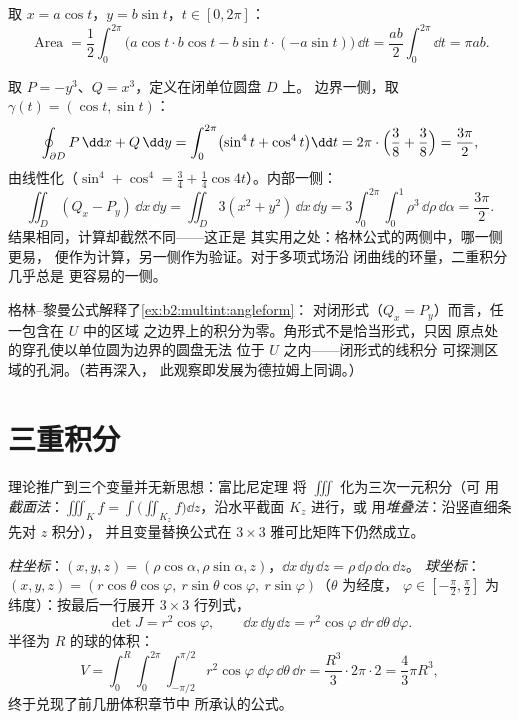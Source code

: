 \begin{example}[椭圆的面积]\label{ex:b2:multint:ellipsearea}
取 $x = a\cos t$，$y = b\sin t$，$t \in [0, 2\pi]$：
\[
\operatorname{Area}
= \frac12\int_0^{2\pi}\bigl(a\cos t \cdot b\cos t
- b\sin t\cdot(-a\sin t)\bigr)\,\dd t
= \frac{ab}{2}\int_0^{2\pi}\dd t = \pi ab .
\]
\end{example}

\begin{example}\label{ex:b2:multint:greencheck}
取 $P = -y^3$、$Q = x^3$，定义在闭单位圆盘 $D$ 上。
边界一侧，取 $\gamma(t) = (\cos t, \sin t)$：
\[
\oint_{\partial D}P\,\dd x + Q\,\dd y
= \int_0^{2\pi}\bigl(\sin^4 t + \cos^4 t\bigr)\dd t
= 2\pi\cdot\Bigl(\frac38 + \frac38\Bigr) = \frac{3\pi}2 ,
\]
由线性化（$\sin^4 + \cos^4 = \tfrac34 +
\tfrac14\cos4t$）。内部一侧：
\[
\iint_D(Q_x - P_y)\,\dd x\,\dd y
= \iint_D 3(x^2 + y^2)\,\dd x\,\dd y
= 3\int_0^{2\pi}\!\!\int_0^1\rho^3\,\dd\rho\,\dd\alpha
= \frac{3\pi}2 .
\]
结果相同，计算却截然不同——这正是
其实用之处：格林公式的两侧中，哪一侧更易，
便作为计算，另一侧作为验证。对于多项式场沿
闭曲线的环量，二重积分几乎总是
更容易的一侧。
\end{example}

\begin{remark}
格林–黎曼公式解释了\cref{ex:b2:multint:angleform}：
对闭形式（$Q_x = P_y$）而言，任一包含在 $U$ 中的区域
之边界上的积分为零。角形式不是恰当形式，只因
原点处的穿孔使以单位圆为边界的圆盘无法
位于 $U$ 之内——闭形式的线积分
可探测区域的孔洞。（若再深入，
此观察即发展为德拉姆上同调。）
\end{remark}

\section{三重积分}

理论推广到三个变量并无新思想：富比尼定理
将 $\iiint$ 化为三次一元积分（可
用\emph{截面法}：$\iiint_K f = \int\bigl(\iint_{K_z}
f\bigr)\dd z$，沿水平截面 $K_z$ 进行，或
用\emph{堆叠法}：沿竖直细条先对 $z$ 积分），
并且变量替换公式在 $3 \times 3$
雅可比矩阵下仍然成立。

\begin{example}[柱坐标与球坐标]\label{ex:b2:multint:spherical}
\emph{柱坐标}：$(x, y, z) = (\rho\cos\alpha, \rho\sin\alpha,
z)$，$\dd x\,\dd y\,\dd z = \rho\,\dd\rho\,\dd\alpha\,\dd z$。
\emph{球坐标}：$(x, y, z) = (r\cos\theta\cos\varphi,\
r\sin\theta\cos\varphi,\ r\sin\varphi)$（$\theta$ 为经度，
$\varphi \in [-\frac\pi2, \frac\pi2]$ 为纬度）：按最后一行展开 $3
\times 3$ 行列式，
\[
\det J = r^2\cos\varphi ,
\qquad
\dd x\,\dd y\,\dd z
= r^2\cos\varphi\;\dd r\,\dd\theta\,\dd\varphi .
\]
半径为 $R$ 的球的体积：
\[
V = \int_0^R\!\!\int_0^{2\pi}\!\!\int_{-\pi/2}^{\pi/2}
r^2\cos\varphi\;\dd\varphi\,\dd\theta\,\dd r
= \frac{R^3}{3}\cdot 2\pi \cdot 2
= \boxed{\frac43\pi R^3} ,
\]
终于兑现了前几册体积章节中
所承认的公式。
\end{example}

